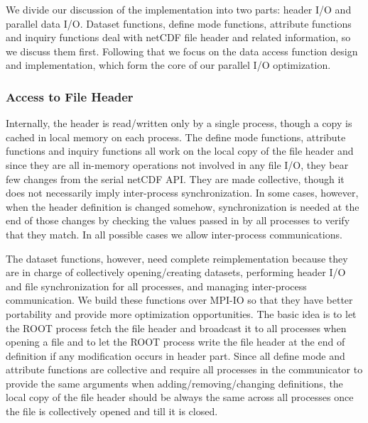 \documentclass[10pt,twocolumn]{article}          %
\begin{document}
We divide our discussion of the implementation into two parts: header I/O and parallel data I/O.
Dataset functions, define mode functions, attribute functions and inquiry functions deal with
netCDF file header and related information, so we discuss them first. Following that we focus on
the data access function design and implementation, which form the core of our parallel I/O
optimization.


\subsubsection{Access to File Header}

Internally, the header is read/written only by a single process, though a copy is cached in local
memory on each process. The define mode functions, attribute functions and inquiry functions all
work on the local copy of the file header and since they are all in-memory operations not involved
in any file I/O, they bear few changes from the serial netCDF API. They are made collective, though
it does not necessarily imply inter-process synchronization. In some cases, however, when the
header definition is changed somehow, synchronization is needed at the end of those changes by
checking the values passed in by all processes to verify that they match. In all possible cases we
allow inter-process communications.

The dataset functions, however, need complete reimplementation because they are in charge of
collectively opening/creating datasets, performing header I/O and file synchronization for all
processes, and managing inter-process communication. We build these functions over MPI-IO so that
they have better portability and provide more optimization opportunities. The basic idea is to let
the ROOT process fetch the file header and broadcast it to all processes when opening a file and to
let the ROOT process write the file header at the end of definition if any modification occurs in
header part. Since all define mode and attribute functions are collective and require all processes
in the communicator to provide the same arguments when adding/removing/changing definitions, the
local copy of the file header should be always the same across all processes once the file is
collectively opened and till it is closed.
\end{document}

